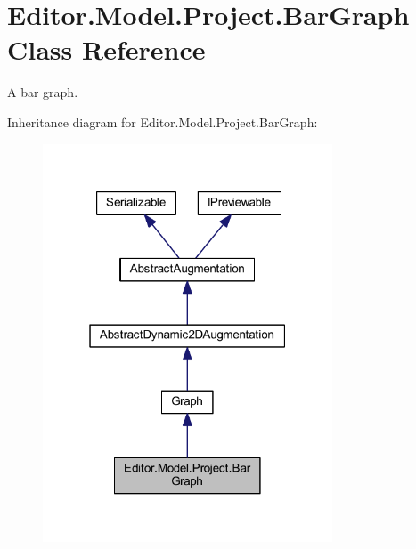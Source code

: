 \section{Editor.\-Model.\-Project.\-Bar\-Graph Class Reference}
\label{class_editor_1_1_model_1_1_project_1_1_bar_graph}


A bar graph.  




Inheritance diagram for Editor.\-Model.\-Project.\-Bar\-Graph\-:
\nopagebreak
\begin{figure}[H]
\begin{center}
\leavevmode
\includegraphics[width=244pt]{class_editor_1_1_model_1_1_project_1_1_bar_graph__inherit__graph}
\end{center}
\end{figure}


